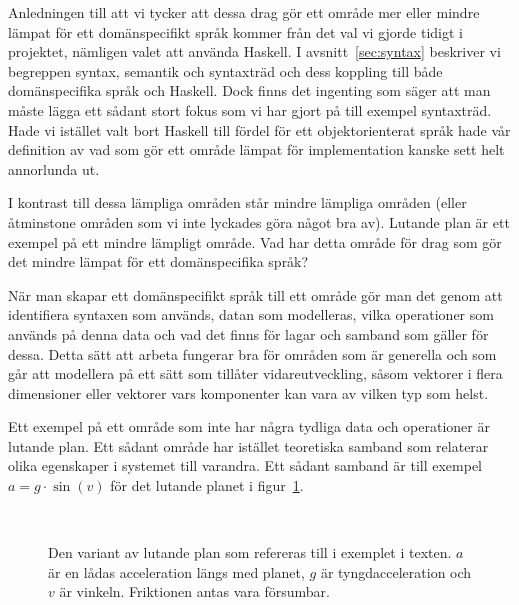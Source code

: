 Anledningen till att vi tycker att dessa drag gör ett område mer eller
mindre lämpat för ett domänspecifikt språk kommer från det val vi gjorde tidigt
i projektet, nämligen valet att använda Haskell. I avsnitt~\ref{sec:syntax}
beskriver vi begreppen syntax, semantik och syntaxträd och dess koppling till
både domänspecifika språk och Haskell. Dock finns det ingenting som säger att
man måste lägga ett sådant stort fokus som vi har gjort på till exempel syntaxträd. Hade
vi istället valt bort Haskell till fördel för ett objektorienterat språk hade vår definition av vad som gör ett område lämpat för
implementation kanske sett helt annorlunda ut.

I kontrast till dessa lämpliga områden står mindre lämpliga områden (eller
åtminstone områden som vi inte lyckades göra något bra av). Lutande plan är ett exempel på ett mindre lämpligt område. Vad har detta område för drag som gör det mindre
lämpat för ett domänspecifika språk?

När man skapar ett domänspecifikt språk till ett område gör man det genom att
identifiera syntaxen som används, datan som modelleras,
vilka operationer som används på denna data och vad det finns för lagar och samband
som gäller för dessa. Detta sätt att arbeta fungerar bra för områden som är
generella och som går att modellera på ett sätt som tillåter vidareutveckling, såsom
vektorer i flera dimensioner eller vektorer vars komponenter kan vara av vilken
typ som helst.

Ett exempel på ett område som inte har några tydliga data och operationer är
lutande plan. Ett sådant område har istället teoretiska samband som relaterar
olika egenskaper i systemet till varandra. Ett sådant samband är till exempel $a
= g \cdot \sin(v)$ för det lutande planet i figur~\ref{fig:lutande_plan}.

\begin{figure}[tph]
  \centering
  \caption{Den variant av lutande plan som refereras till i exemplet i texten. $a$
  är en lådas acceleration längs med planet, $g$ är tyngdacceleration och $v$ är
  vinkeln. Friktionen antas vara försumbar.}~\label{fig:lutande_plan}
\end{figure}

